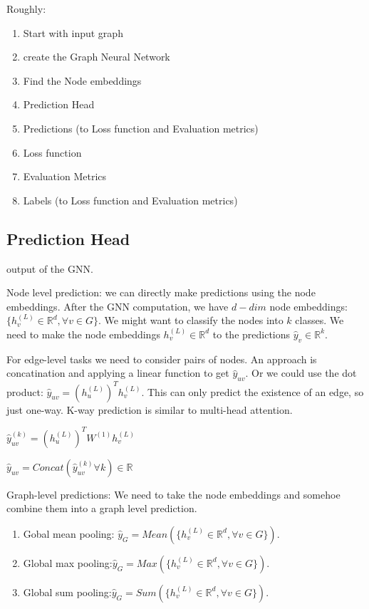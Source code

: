 \documentclass{article}
\begin{document}
Roughly:

\begin{enumerate}
    \item Start with input graph
    \item create the Graph Neural Network
    \item Find the Node embeddings
    \item Prediction Head
    \item Predictions (to Loss function and Evaluation metrics)
    \item Loss function
    \item Evaluation Metrics
    \item Labels (to Loss function and Evaluation metrics)
\end{enumerate}

\subsection{Prediction Head}

output of the GNN.

Node level prediction: we can directly make predictions using the node embeddings. After the GNN computation, we have $d-dim$ node embeddings: $\{h_v^{(L)} \in \mathbb{R}^d, \forall v \in G\}$.
We might want to classify the nodes into $k$ classes. We need to make the node embeddings $h_v^{(L)} \in \mathbb{R}^d$ to the predictions $\hat{y}_v \in \mathbb{R}^k$. 

For edge-level tasks we need to consider pairs of nodes.
An approach is concatination and applying a linear function to get $\hat{y}_{uv}$. Or we could use the dot product: $\hat{y}_{uv} = (h_u^{(L)})^T h_v^{(L)}$. This can only predict the existence of an edge, so just one-way. K-way prediction is similar to multi-head attention. 

$\hat{y}_{uv}^{(k)} = (h_u^{(L)})^TW^{(1)}h_v^{(L)}$

$\hat{y}_{uv} = Concat(\hat{y}_{uv}^{(k)} \forall k) \in \mathbb{R}$

Graph-level predictions: We need to take the node embeddings and somehoe combine them into a graph level prediction.

\begin{enumerate}
    \item Gobal mean pooling: $\hat{y}_G = Mean(\{h_v^{(L)} \in \mathbb{R}^d, \forall v \in G \})$.
    \item Global max pooling:$\hat{y}_G = Max(\{h_v^{(L)} \in \mathbb{R}^d, \forall v \in G \})$.
    \item Global sum pooling:$\hat{y}_G = Sum(\{h_v^{(L)} \in \mathbb{R}^d, \forall v \in G \})$.
\end{enumerate}
\end{document}
